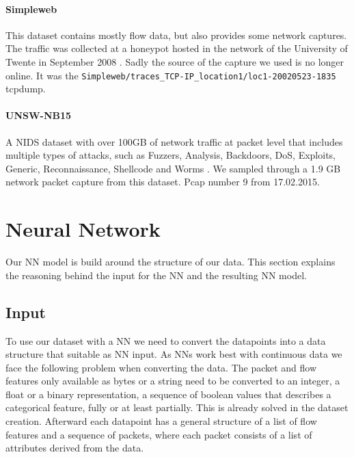 \documentclass[
	ngerman,
	ruledheaders=section,%
	class=report,%
	thesis={type=bachelor},%
	accentcolor=9c,%
	custommargins=true,%
	marginpar=false,%
	parskip=half-,%
	fontsize=11pt,%
]{tudapub}
\let\code\texttt
\begin{document}
\paragraph{Simpleweb} This dataset contains mostly flow data, but also provides some network captures.
The traffic was collected at a honeypot hosted in the network of the University of Twente in September 2008 \cite{LabeledDatasetIntrusiona}.
Sadly the source of the capture we used is no longer online.
It was the \code{Simpleweb/traces\_TCP-IP\_location1/loc1-20020523-1835} tcpdump.

\paragraph{UNSW-NB15} A NIDS dataset with over 100GB of network traffic at packet level that includes multiple types of attacks, such as Fuzzers, Analysis, Backdoors, DoS, Exploits, Generic, Reconnaissance, Shellcode and Worms \cite{UNSWNB15DataSet}.
We sampled through a 1.9 GB network packet capture from this dataset.
Pcap number 9 from 17.02.2015.

\section{Neural Network}
\label{sec:NN}

Our NN model is build around the structure of our data.
This section explains the reasoning behind the input for the NN and the resulting NN model.

\subsection{Input}
\label{sec:NNinput}

To use our dataset with a NN we need to convert the datapoints into a data structure that suitable as NN input.
As NNs work best with continuous data we face the following problem when converting the data.
The packet and flow features only available as bytes or a string need to be converted to an integer, a float or a binary representation, a sequence of boolean values that describes a categorical feature, fully or at least partially.
This is already solved in the dataset creation.
Afterward each datapoint has a general structure of a list of flow features and a sequence of packets, where each packet consists of a list of attributes derived from the data.
\end{document}
